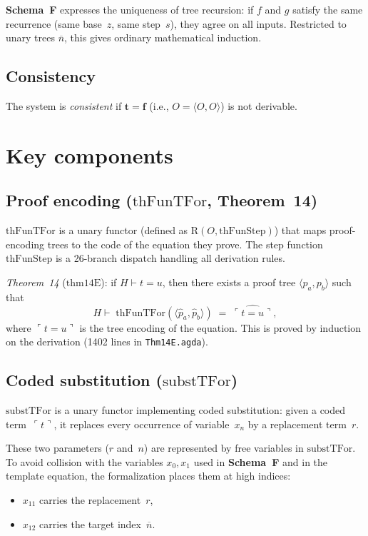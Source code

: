 \documentclass[11pt]{article}
\newcommand{\pair}[2]{\langle #1, #2 \rangle}
\newcommand{\true}{\mathbf{t}}
\newcommand{\false}{\mathbf{f}}
\newcommand{\SchemaF}{\textbf{Schema~F}}
\newcommand{\nat}[1]{\overline{#1}}
\begin{document}
\medskip
\SchemaF{} expresses the uniqueness of tree recursion:
if $f$ and $g$ satisfy the same recurrence (same base~$z$, same step~$s$),
they agree on all inputs.  Restricted to unary trees $\nat{n}$,
this gives ordinary mathematical induction.

\subsection*{Consistency}

The system is \emph{consistent} if $\true = \false$
(i.e., $O = \pair{O}{O}$) is not derivable.

\section{Key components}

\subsection{Proof encoding ($\mathrm{thFunTFor}$, Theorem~14)}

$\mathrm{thFunTFor}$ is a unary functor
(defined as $\mathrm{R}(O, \mathrm{thFunStep})$)
that maps proof-encoding trees to the code of the equation they prove.
The step function $\mathrm{thFunStep}$ is a 26-branch dispatch
handling all derivation rules.

\emph{Theorem~14} ($\mathrm{thm14E}$): if $H \vdash t = u$,
then there exists a proof tree $\pair{p_a}{p_b}$ such that
\[
  H \vdash\;
  \mathrm{thFunTFor}(\pair{\hat p_a}{\hat p_b})
  \;=\; \widehat{\ulcorner t = u \urcorner},
\]
where $\ulcorner t = u \urcorner$ is the tree encoding of the
equation.
This is proved by induction on the derivation (1402 lines in
\texttt{Thm14E.agda}).

\subsection{Coded substitution ($\mathrm{substTFor}$)}

$\mathrm{substTFor}$ is a unary functor implementing coded
substitution: given a coded term~$\ulcorner t \urcorner$,
it replaces every occurrence of variable~$x_n$ by a
replacement term~$r$.

These two parameters ($r$ and~$n$) are represented by free variables
in $\mathrm{substTFor}$.  To avoid collision with the variables
$x_0, x_1$ used in \SchemaF{} and in the template equation,
the formalization places them at high indices:
\begin{itemize}
\item $x_{11}$ carries the replacement~$r$,
\item $x_{12}$ carries the target index~$\nat{n}$.
\end{itemize}
\end{document}

